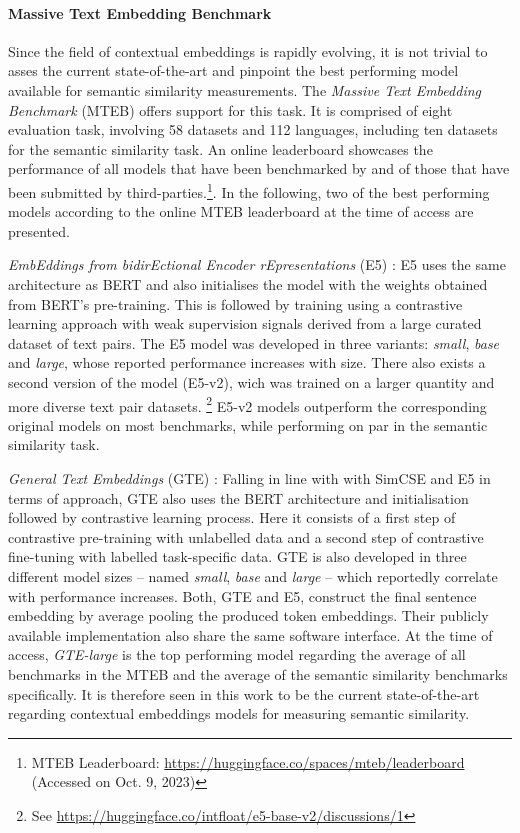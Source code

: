 \documentclass[11pt]{scrreprt}
\let\citef\cite  %
\let\cite\parencite  %
\begin{document}
\paragraph{Massive Text Embedding Benchmark}
Since the field of contextual embeddings is rapidly evolving, it is not trivial to asses the current state-of-the-art and pinpoint the best performing model available for semantic similarity measurements.
The \textit{Massive Text Embedding Benchmark} (MTEB) \cite{muennighoffMTEBMassiveText2023} offers support for this task. It is comprised of eight evaluation task, involving 58 datasets and 112 languages, including ten datasets for the semantic similarity task. An online leaderboard showcases the performance of all models that have been benchmarked by \citef{muennighoffMTEBMassiveText2023} and of those that have been submitted by third-parties.\footnote{MTEB Leaderboard: \url{https://huggingface.co/spaces/mteb/leaderboard} (Accessed on Oct. 9, 2023)}. In the following, two of the best performing models according to the online MTEB leaderboard at the time of access are presented.

\textit{EmbEddings from bidirEctional Encoder rEpresentations} (E5) \cite{wangTextEmbeddingsWeaklySupervised2022}:
E5 uses the same architecture as BERT and also initialises the model with the weights obtained from BERT's pre-training. This is followed by training using a contrastive learning approach with weak supervision signals derived from a large curated dataset of text pairs. The E5 model was developed in three variants: \textit{small}, \textit{base} and \textit{large}, whose reported performance increases with size. There also exists a second version of the model (E5-v2), wich was trained on a larger quantity and more diverse text pair datasets. \footnote{See \url{https://huggingface.co/intfloat/e5-base-v2/discussions/1}} E5-v2 models outperform the corresponding original models on most benchmarks, while performing on par in the semantic similarity task.

\textit{General Text Embeddings} (GTE) \cite{liGeneralTextEmbeddings2023}: Falling in line with with SimCSE and E5 in terms of approach, GTE also uses the BERT architecture and initialisation followed by contrastive learning process. Here it consists of a first step of contrastive pre-training with unlabelled data and a second step of contrastive fine-tuning with labelled task-specific data. GTE is also developed in three different model sizes -- named \textit{small}, \textit{base} and \textit{large} -- which reportedly correlate with performance increases. Both, GTE and E5, construct the final sentence embedding by average pooling the produced token embeddings. Their publicly available implementation also share the same software interface. At the time of access, \textit{GTE-large} is the top performing model regarding the average of all benchmarks in the MTEB and the average of the semantic similarity benchmarks specifically. It is therefore seen in this work to be the current state-of-the-art regarding contextual embeddings models for measuring semantic similarity.
\end{document}
